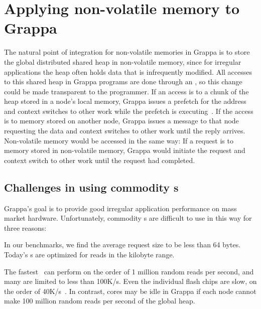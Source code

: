 \section{Applying non-volatile memory to Grappa}
The natural point of integration for non-volatile memories in Grappa
is to store the global distributed shared heap in non-volatile memory, since for irregular applications the heap
often holds data that is infrequently modified. All accesses to
this shared heap in Grappa programs are done through an , so this change could be made transparent to the programmer. 
If an 
access is to a chunk of the heap stored in a node's local memory, Grappa issues a prefetch for the address
and context switches to other work while the prefetch is executing~\cite{Nelson:hotpar2011}. If
the access is to memory stored on another node, Grappa issues a
message to that node requesting the data and context switches to other
work until the reply arrives. Non-volatile memory would be accessed in
the same way: If a request is to memory stored in non-volatile memory,
Grappa would initiate the request and context switch to other work
until the request had completed.

\subsection{Challenges in using commodity \hspace{0.75pt}s}
Grappa's goal is to provide good irregular application performance on
mass market hardware. Unfortunately, commodity \hspace{0.75pt}s are
difficult to use in this way for three reasons:

 In our benchmarks, we find the average request size to be
less than 64 bytes. Today's \hspace{0.75pt}s are optimized for reads in the
kilobyte range.  

 The fastest~\cite{fusionio} can
perform on the order of 1 million random reads per second, and many
are limited to less than 100K/s. Even the individual flash chips are slow, on the order of 40K/s~\cite{micronFlash}. In contrast, cores may be idle in
Grappa if each node cannot make 100 million random reads per second of
the global heap. 

